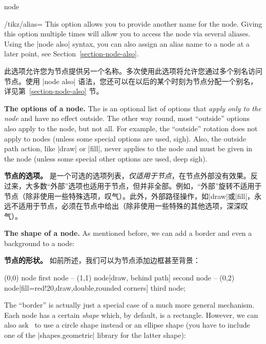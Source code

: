 \begin{pathoperation}{node}
    \begin{key}{/tikz/alias=}
        This option allows you to provide another name for the node. Giving
        this option multiple times will allow you to access the node via
        several aliases. Using the |node also| syntax, you can also assign an
        alias name to a node at a later point, see
        Section~\ref{section-node-also}.

        此选项允许您为节点提供另一个名称。多次使用此选项将允许您通过多个别名访问节点。使用 |node also| 语法，您还可以在以后的某个时刻为节点分配一个别名，详见第~\ref{section-node-also} 节。
    \end{key}

    \medskip
    \textbf{The options of a node.}
    The  is an optional list of options that \emph{apply only to
    the node} and have no effect outside. The other way round, most ``outside''
    options also apply to the node, but not all. For example, the ``outside''
    rotation does not apply to nodes (unless some special options are used,
    sigh). Also, the outside path action, like |draw| or |fill|, never applies
    to the node and must be given in the node (unless some special other
    options are used, deep sigh).


    \textbf{节点的选项。}
是一个可选的选项列表，\emph{仅适用于节点}，在节点外部没有效果。反过来，大多数“外部”选项也适用于节点，但并非全部。例如，“外部”旋转不适用于节点（除非使用一些特殊选项，叹气）。此外，外部路径操作，如|draw|或|fill|，永远不适用于节点，必须在节点中给出（除非使用一些特殊的其他选项，深深叹气）。

    \medskip
    \textbf{The shape of a node.}
    As mentioned before, we can add a border and even a background to a node:

    \textbf{节点的形状。}
如前所述，我们可以为节点添加边框甚至背景：
\begin{codeexample}[]
\tikz \fill[fill=yellow!80!black]
      (0,0) node {first node}
   -- (1,1) node[draw, behind path] {second node}
   -- (0,2) node[fill=red!20,draw,double,rounded corners] {third node};
\end{codeexample}

    The ``border'' is actually just a special case of a much more general
    mechanism. Each node has a certain \emph{shape} which, by default, is a
    rectangle. However, we can also ask \tikzname\ to use a circle shape
    instead or an ellipse shape (you have to include one of the
    |shapes.geometric| library for the latter shape):


\end{pathoperation}

